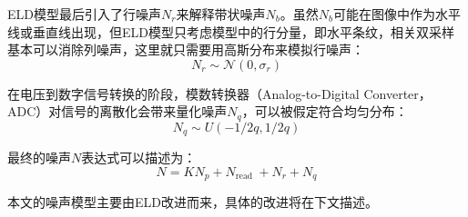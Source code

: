 ELD模型最后引入了行噪声$N_r$来解释带状噪声$N_b$。虽然$N_b$可能在图像中作为水平线或垂直线出现，但ELD模型只考虑模型中的行分量，即水平条纹，相关双采样基本可以消除列噪声，这里就只需要用高斯分布来模拟行噪声：
\begin{equation}
	N_r \sim \mathcal{N}\left(0, \sigma_r\right)
\end{equation}

在电压到数字信号转换的阶段，模数转换器（Analog-to-Digital Converter，ADC）对信号的离散化会带来量化噪声$N_q$，可以被假定符合均匀分布：
\begin{equation}
	N_q \sim U(-1 / 2 q, 1 / 2 q)
\end{equation}

最终的噪声$N$表达式可以描述为：
\begin{equation}
	N=K N_p+N_{\text {read }}+N_r+N_q
\end{equation}

本文的噪声模型主要由ELD改进而来，具体的改进将在下文描述。


